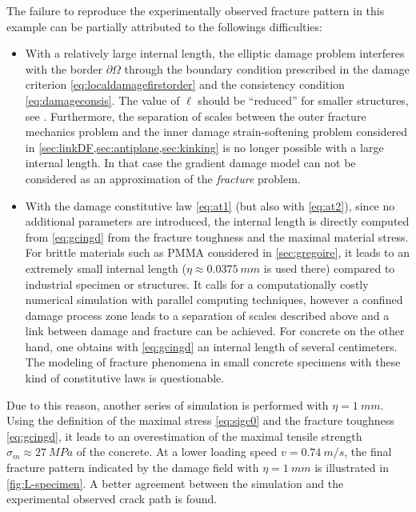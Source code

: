 The failure to reproduce the experimentally observed fracture pattern in this example can be partially attributed to the followings difficulties:
\begin{itemize}
\item With a relatively large internal length, the elliptic damage problem interferes with the border $\partial\Omega$ through the boundary condition prescribed in the damage criterion \eqref{eq:localdamagefirstorder} and the consistency condition \eqref{eq:damageconsis}. The value of $\ell$ should be ``reduced'' for smaller structures, see \cite{LorentzGodard:2011}. Furthermore, the separation of scales between the outer fracture mechanics problem and the inner damage strain-softening problem considered in \cref{sec:linkDF,sec:antiplane,sec:kinking} is no longer possible with a large internal length. In that case the gradient damage model can not be considered as an approximation of the \emph{fracture} problem.

\item With the damage constitutive law \eqref{eq:at1} (but also with \eqref{eq:at2}), since no additional parameters are introduced, the internal length is directly computed from \eqref{eq:gcingd} from the fracture toughness and the maximal material stress. For brittle materials such as PMMA considered in \cref{sec:gregoire}, it leads to an extremely small internal length ($\eta\approx\SI{0.0375}{mm}$ is used there) compared to industrial specimen or structures. It calls for a computationally costly numerical simulation with parallel computing techniques, however a confined damage process zone leads to a separation of scales described above and a link between damage and fracture can be achieved. For concrete on the other hand, one obtains with \eqref{eq:gcingd} an internal length of several centimeters. The modeling of fracture phenomena in small concrete specimens with these kind of constitutive laws is questionable.
\end{itemize}

Due to this reason, another series of simulation is performed with $\eta=\SI{1}{mm}$. Using the definition of the maximal stress \eqref{eq:sigc0} and the fracture toughness \eqref{eq:gcingd}, it leads to an overestimation of the maximal tensile strength $\sigma_m\approx \SI{27}{MPa}$ of the concrete. At a lower loading speed $v=\SI{0.74}{m/s}$, the final fracture pattern indicated by the damage field with $\eta=\SI{1}{mm}$ is illustrated in \cref{fig:L-specimen}. A better agreement between the simulation and the experimental observed crack path is found.

